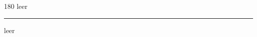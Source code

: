 
\begin{frame}
\begin{center}
\begin{turn}{180}
{\fontsize{2.5cm}{1em}\selectfont leer}
\end{turn}
\vspace{1em}\par  
\hrule
\vspace{1em}\par  
{\fontsize{2.5cm}{1em}\selectfont leer}
\end{center}
\end{frame}
